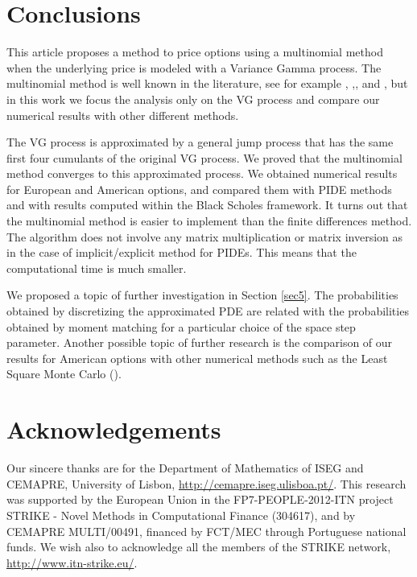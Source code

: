 \documentclass[]{interact}
\theoremstyle{plain}%
\theoremstyle{definition}
\theoremstyle{remark}
\begin{document}
\section{Conclusions} \label{sec6}

This article proposes a method to price options using a multinomial method when the underlying price is modeled with a Variance Gamma 
process.
The multinomial method is well known in the literature, see for example 
\cite{Cont}, \cite{KeWe06} ,\cite{YaPr01}, \cite{YaPr03} and \cite{YaPr06}, but in this work we focus the analysis only on the VG process 
and compare our numerical results with other different methods. 

The VG process is approximated by a general jump process that has the same first four cumulants of the original VG process. 
We proved that the multinomial method converges to this approximated process.
We obtained numerical results for European and American options, and compared them with PIDE methods and with results computed within
the Black Scholes framework. 
It turns out that the multinomial method is easier to implement than the finite differences method. The algorithm does not involve any matrix multiplication or matrix
inversion as in the case of implicit/explicit method for PIDEs. This means that the computational time is much smaller. 

We proposed a topic of further investigation in Section \ref{sec5}. The probabilities obtained by discretizing the approximated PDE are
related with the probabilities obtained by moment matching for a particular choice of the space step parameter.  
Another possible topic of further research is the comparison of our results for American options 
with other numerical methods such as the Least Square Monte Carlo (\cite{LoSc01}).


\section*{Acknowledgements}
Our sincere thanks are for the Department of Mathematics of ISEG and CEMAPRE, University of Lisbon, 
\url{http://cemapre.iseg.ulisboa.pt/}.
This research was supported by the European Union in the FP7-PEOPLE-2012-ITN project STRIKE - 
Novel Methods in Computational Finance (304617), and by CEMAPRE
MULTI/00491, financed by FCT/MEC through Portuguese national funds.
We wish also to acknowledge all the members of the STRIKE network, \url{http://www.itn-strike.eu/}.
\end{document}

